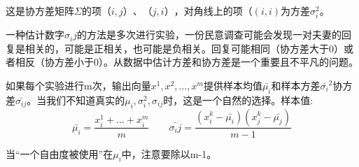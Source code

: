 	这是协方差矩阵$\Sigma$的项$（i,j）、（j,i）$，对角线上的项（$(i,i)$为方差$\sigma^2_i$。
	
	一种估计数字$\sigma_ij$的方法是多次进行实验，一份民意调查可能会发现一对夫妻的回复是相关的，可能是正相关，也可能是负相关。回复可能相同（协方差大于0）或者相反（协方差小于0）。从数据中估计方差和协方差是一个重要且不平凡的问题。
	
	如果每个实验进行m次，输出向量$x^1,x^2,...,x^m$提供样本均值$\bar{\mu_i}$和样本方差$\bar{\sigma_i}^2$协方差$\bar{\sigma_{ij}}$。当我们不知道真实的$\mu_i,\sigma^2_i,\sigma_{ij}$时，这是一个自然的选择。样本值:
	\begin{equation}
	\bar{\mu_i}=\frac{x^1_i+...+x^m_i}{m}  \qquad \bar{\sigma_ij}=\frac{(x^k_i-\bar{\mu_i})(x^k_j-\bar{\mu_j})}{m-1}
	\end{equation}
	
	当“一个自由度被使用”在$\mu_i$中，注意要除以m-1。
	
